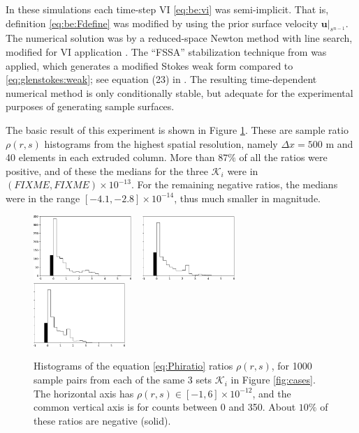 \documentclass[hidelinks,onefignum,onetabnum,final]{siamart220329}  %
\newcommand{\bu}{\mathbf{u}}
\newcommand{\cK}{\mathcal{K}}
\begin{document}
In these simulations each time-step VI \eqref{eq:be:vi} was semi-implicit.  That is, definition \eqref{eq:be:Fdefine} was modified by using the prior surface velocity $\bu|_{s^{n-1}}$.  The numerical solution was by a reduced-space Newton method with line search, modified for VI application \cite{BensonMunson2006}.  The ``FSSA'' stabilization technique from \cite{LofgrenAhlkronaHelanow2022} was applied, which generates a modified Stokes weak form compared to \eqref{eq:glenstokes:weak}; see equation (23) in \cite{LofgrenAhlkronaHelanow2022}.  The resulting time-dependent numerical method is only conditionally stable, but adequate for the experimental purposes of generating sample surfaces.

The basic result of this experiment is shown in Figure \ref{fig:ratios}.  These are sample ratio $\rho(r,s)$ histograms from the highest spatial resolution, namely $\Delta x=500$ m and 40 elements in each extruded column.  More than $87\%$ of all the ratios were positive, and of these the medians for the three $\cK_i$ were in $(FIXME,FIXME) \times 10^{-13}$.  For the remaining negative ratios, the medians were in the range $[-4.1,-2.8]\times 10^{-14}$, thus much smaller in magnitude.

\begin{figure}[ht]
\mbox{\includegraphics[width=0.33\textwidth]{figs/flatratios.png} \, \includegraphics[width=0.31\textwidth]{figs/smoothratios.png} \, \includegraphics[width=0.31\textwidth]{figs/roughratios.png}}

\caption{Histograms of the equation \eqref{eq:Phiratio} ratios $\rho(r,s)$, for 1000 sample pairs from each of the same 3 sets $\cK_i$ in Figure \ref{fig:cases}.  The horizontal axis has  $\rho(r,s) \in [-1,6]\times 10^{-12}$, and the common vertical axis is for counts between 0 and 350.  About $10\%$ of these ratios are negative (solid).}
\label{fig:ratios}
\end{figure}
\end{document}
